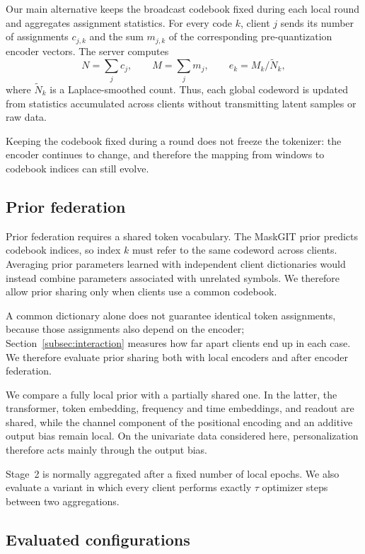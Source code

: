 \documentclass[conference]{IEEEtran}
\begin{document}
Our main alternative keeps the broadcast codebook fixed during each local round and aggregates assignment statistics. For every code $k$, client $j$ sends its number of assignments $c_{j,k}$ and the sum $m_{j,k}$ of the corresponding pre-quantization encoder vectors. The server computes
\begin{equation}
    N = \sum_j c_j, \qquad
    M = \sum_j m_j, \qquad
    e_k = M_k / \tilde{N}_k,
    \label{eq:suffstat}
\end{equation}
where $\tilde{N}_k$ is a Laplace-smoothed count. Thus, each global codeword is updated from statistics accumulated across clients without transmitting latent samples or raw data.

Keeping the codebook fixed during a round does not freeze the tokenizer: the encoder continues to change, and therefore the mapping from windows to codebook indices can still evolve.

\subsection{Prior federation}
\label{subsec:coupling}

Prior federation requires a shared token vocabulary. The MaskGIT prior predicts codebook indices, so index $k$ must refer to the same codeword across clients. Averaging prior parameters learned with independent client dictionaries would instead combine parameters associated with unrelated symbols. We therefore allow prior sharing only when clients use a common codebook.

A common dictionary alone does not guarantee identical token assignments, because those assignments also depend on the encoder; Section~\ref{subsec:interaction} measures how far apart clients end up in each case. We therefore evaluate prior sharing both with local encoders and after encoder federation.

We compare a fully local prior with a partially shared one. In the latter, the transformer, token embedding, frequency and time embeddings, and readout are shared, while the channel component of the positional encoding and an additive output bias remain local. On the univariate data considered here, personalization therefore acts mainly through the output bias.

Stage~2 is normally aggregated after a fixed number of local epochs. We also evaluate a variant in which every client performs exactly $\tau$ optimizer steps between two aggregations.

\subsection{Evaluated configurations}
\label{subsec:configs}
\end{document}
